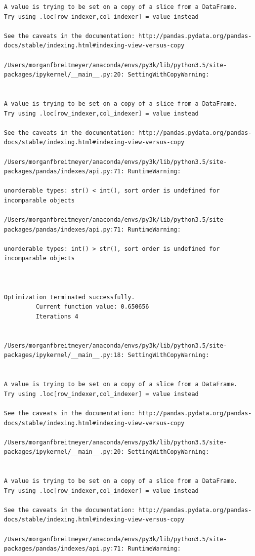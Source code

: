 \begin{lstlisting}
A value is trying to be set on a copy of a slice from a DataFrame.
Try using .loc[row_indexer,col_indexer] = value instead

See the caveats in the documentation: http://pandas.pydata.org/pandas-docs/stable/indexing.html#indexing-view-versus-copy

/Users/morganfbreitmeyer/anaconda/envs/py3k/lib/python3.5/site-packages/ipykernel/__main__.py:20: SettingWithCopyWarning:


A value is trying to be set on a copy of a slice from a DataFrame.
Try using .loc[row_indexer,col_indexer] = value instead

See the caveats in the documentation: http://pandas.pydata.org/pandas-docs/stable/indexing.html#indexing-view-versus-copy

/Users/morganfbreitmeyer/anaconda/envs/py3k/lib/python3.5/site-packages/pandas/indexes/api.py:71: RuntimeWarning:

unorderable types: str() < int(), sort order is undefined for incomparable objects

/Users/morganfbreitmeyer/anaconda/envs/py3k/lib/python3.5/site-packages/pandas/indexes/api.py:71: RuntimeWarning:

unorderable types: int() > str(), sort order is undefined for incomparable objects



Optimization terminated successfully.
         Current function value: 0.650656
         Iterations 4


/Users/morganfbreitmeyer/anaconda/envs/py3k/lib/python3.5/site-packages/ipykernel/__main__.py:18: SettingWithCopyWarning:


A value is trying to be set on a copy of a slice from a DataFrame.
Try using .loc[row_indexer,col_indexer] = value instead

See the caveats in the documentation: http://pandas.pydata.org/pandas-docs/stable/indexing.html#indexing-view-versus-copy

/Users/morganfbreitmeyer/anaconda/envs/py3k/lib/python3.5/site-packages/ipykernel/__main__.py:20: SettingWithCopyWarning:


A value is trying to be set on a copy of a slice from a DataFrame.
Try using .loc[row_indexer,col_indexer] = value instead

See the caveats in the documentation: http://pandas.pydata.org/pandas-docs/stable/indexing.html#indexing-view-versus-copy

/Users/morganfbreitmeyer/anaconda/envs/py3k/lib/python3.5/site-packages/pandas/indexes/api.py:71: RuntimeWarning:


\end{lstlisting}
